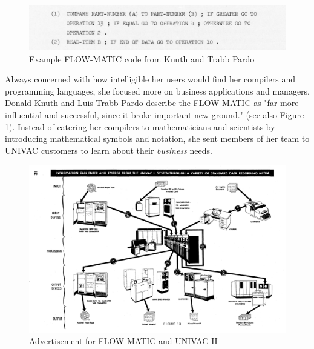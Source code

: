 \begin{figure}[h]
	\centering
	\includegraphics[width=.7\textwidth]{resource/flow-matic-example-knuth-pardo.png}
	\caption{Example FLOW-MATIC code from Knuth and Trabb Pardo\cite{Knuth_TrabbPardo_1976_Early_Development}}
	\label{fig:knuth-pardo-flow-matic-example}
\end{figure}

Always concerned with how intelligible her users would find her compilers
and programming languages, she focused more on business applications and managers.
Donald Knuth and Luis Trabb Pardo describe the FLOW-MATIC as
"far more influential and successful, since it broke important new ground."
\cite{Knuth_TrabbPardo_1976_Early_Development}
(see also Figure \ref{fig:knuth-pardo-flow-matic-example}).
Instead of catering her compilers to mathematicians and scientists
by introducing mathematical symbols and notation, she sent members of
her team to UNIVAC customers to learn about their \textit{business} needs.

\begin{figure}
	\centering
	\includegraphics[width=.7\textwidth]{resource/flow-matic-ad-1959.png}
	\caption{Advertisement for FLOW-MATIC and UNIVAC II}
	\label{fig:flow-matic-ad-1959}
\end{figure}

